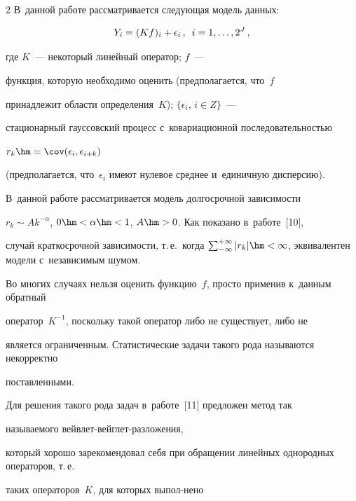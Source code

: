 \begin{multicols}{2}
В~данной работе рассматривается следующая модель данных:



\noindent

\begin{equation}

\label{Data_Model_Operator}

Y_i=(Kf)_i+\epsilon_i\,,\enskip i=1,\ldots, 2^J\,,

\end{equation}

где $K$~--- некоторый линейный оператор; $f$~--- 

функция, которую необходимо оценить (предполагается, что~$f$ 

принадлежит области определения~$K$); $\{\epsilon_i$, $i \in Z\}$~--- 

стационарный гауссовский процесс с~ковариационной последовательностью 

$r_k \hm= \cov(\epsilon_i,\epsilon_{i+k})$ 

(предполагается, что~$\epsilon_i$ имеют нулевое среднее и~единичную дисперсию). 



В~данной работе рассматривается модель долгосрочной зависимости 

$r_k \sim Ak^{-\alpha}$, $0\hm < \alpha \hm<1$, $A\hm>0$. Как показано в~работе~[10], 

случай краткосрочной зависимости, т.\,е.\ когда $\sum\nolimits_{-\infty}^{+\infty} 

|r_k| \hm< \infty$, эквивалентен модели с~независимым шумом.



 Во многих случаях нельзя оценить функцию~$f$, просто применив к~данным обратный 

 оператор~$K^{-1}$, поскольку такой оператор либо не существует, либо не 

 является ограниченным. Статистические задачи такого рода называются \mbox{некорректно} 

 поставленными. 

 

 Для решения такого рода задач в~работе~[11] предложен метод так 

 называемого вейв\-лет-вейг\-лет-раз\-ло\-же\-ния, 

 который хорошо зарекомендовал себя при обращении линейных однородных операторов, т.\,е.\

  таких операторов~$K$, для которых выпол-\linebreak нено


\end{multicols}
